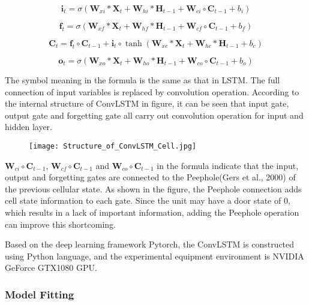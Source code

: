 \documentclass[
]{article}
\begin{document}
\begin{equation}
\mathbf{i}_t=\sigma(\mathbf{W}_{xi}*\mathbf{X}_{t}+\mathbf{W}_{hi}*\mathbf{H}_{t-1}+\mathbf{W}_{ci}\circ\mathbf{C}_{t-1}+b_i)
\end{equation}

\begin{equation}
\mathbf{f}_t=\sigma(\mathbf{W}_{xf}*\mathbf{X}_{t}+\mathbf{W}_{hf}*\mathbf{H}_{t-1}+\mathbf{W}_{cf}\circ\mathbf{C}_{t-1}+b_f) 
\end{equation}

\begin{equation}
\mathbf{C}_t=\mathbf{f}_{t}\circ\mathbf{C}_{t-1}+\mathbf{i}_t\circ\tanh(\mathbf{W}_{xc}*\mathbf{X}_{t}+\mathbf{W}_{hc}*\mathbf{H}_{t-1}+b_c)
\end{equation}

\begin{equation}
\mathbf{o}_t=\sigma(\mathbf{W}_{xo}*\mathbf{X}_{t}+\mathbf{W}_{ho}*\mathbf{H}_{t-1}+\mathbf{W}_{co}\circ\mathbf{C}_{t-1}+b_o)
\end{equation}

The symbol meaning in the formula is the same as that in LSTM. The full
connection of input variables is replaced by convolution operation.
According to the internal structure of ConvLSTM in figure, it can be
seen that input gate, output gate and forgetting gate all carry out
convolution operation for input and hidden layer.

\begin{figure}
\centering
\texttt{[image: Structure\_of\_ConvLSTM\_Cell.jpg]}
\caption{}
\end{figure}

\(\mathbf{W}_{ci}\circ\mathbf{C}_{t-1}\),
\(\mathbf{W}_{cf}\circ\mathbf{C}_{t-1}\) and
\(\mathbf{W}_{co}\circ\mathbf{C}_{t-1}\) in the formula indicate
that the input, output and forgetting gates are connected to the
Peephole(Gers et al., 2000) of the previous cellular state. As shown in
the figure, the Peephole connection adds cell state information to each
gate. Since the unit may have a door state of 0, which results in a lack
of important information, adding the Peephole operation can improve this
shortcoming.

Based on the deep learning framework Pytorch, the ConvLSTM is
constructed using Python language, and the experimental equipment
environment is NVIDIA GeForce GTX1080 GPU.

\hypertarget{model-fitting}{%
\subsubsection{Model Fitting}\label{model-fitting}}
\end{document}
